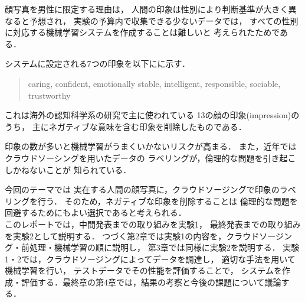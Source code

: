 顔写真を男性に限定する理由は，
人間の印象は性別により判断基準が大きく異なると予想され，
実験の予算内で収集できる少ないデータでは，
すべての性別に対応する機械学習システムを作成することは難しいと
考えられたためである．

システムに設定される7つの印象を以下にに示す．

\begin{quote}
  {\small
  caring, confident, 
  emotionally stable, intelligent, 
  responsible, sociable,
  trustworthy }
\end{quote}
  
これは海外の認知科学系の研究で主に使われている
13の顔の印象(impression)\cite{doi:10.1073/pnas.1807222115}のうち，
主にネガティブな意味を含む印象を削除したものである．

印象の数が多いと機械学習がうまくいかないリスクが高まる．
また，近年ではクラウドソーシングを用いたデータの
ラベリングが，倫理的な問題を引き起こしかねないことが
知られている\cite{ai-rinri}．

今回のテーマでは
実在する人間の顔写真に，クラウドソージングで印象のラベリングを行う．
そのため，ネガティブな印象を削除することは
倫理的な問題を回避するためにもよい選択であると考えられる．
\\

このレポートでは，中間発表までの取り組みを実験1，
最終発表までの取り組みを実験2として説明する．
つづく第2章では実験1の内容を，クラウドソージング・前処理・機械学習の順に説明し，
第3章では同様に実験2を説明する．
実験1・2では，クラウドソージングによってデータを調達し，
適切な手法を用いて機械学習を行い，
テストデータでその性能を評価することで，
システムを作成・評価する．最終章の第4章では，結果の考察と今後の課題について議論する．